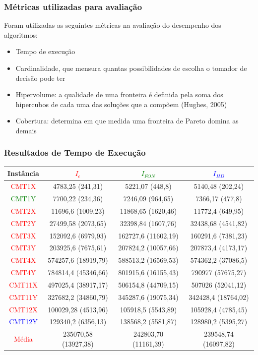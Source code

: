 \documentclass{beamer}
\begin{document}
\begin{frame}
  \frametitle{Métricas utilizadas para avaliação}
    Foram utilizadas as seguintes métricas na avaliação do desempenho dos algoritmos:
    \begin{itemize}
    \item Tempo de execução
    \item Cardinalidade, que mensura quantas possibilidades de escolha o tomador de decisão pode ter
    \item Hipervolume: a qualidade de uma fronteira é definida pela soma dos hipercubos de cada uma das soluções que a compõem (Hughes, 2005)
    \item Cobertura: determina em que medida uma fronteira de Pareto domina as demais
    \end{itemize}
  
\end{frame}

\begin{frame}
  \frametitle{Resultados de Tempo de Execução}
    \footnotesize{
    \begin{tabular}{c|ccc}
\hline
Instância & \textcolor{red}{$I_{\epsilon}$}             & \textcolor{green}{$I_{FON}$}             & \textcolor{blue}{ $I_{HD}$}      \\
\hline
\textcolor{red}{CMT1X}     & 4783,25 (241,31)    & 5221,07 (448,8)     & 5140,48 (202,24)    \\
\textcolor{green}{CMT1Y}     & 7700,22 (234,36)    & 7246,09 (964,65)    & 7366,17 (477,8)     \\
\textcolor{red}{CMT2X}     & 11696,6 (1009,23)   & 11868,65 (1620,46)  & 11772,4 (649,95)    \\
\textcolor{red}{CMT2Y}     & 27499,58 (2073,65)  & 32398,84 (1607,76)  & 32438,68 (4541,82)  \\
\textcolor{red}{CMT3X}     & 152092,6 (6979,93)  & 162727,6 (11602,19) & 160291,6 (7381,23)  \\
\textcolor{red}{CMT3Y}     & 203925,6 (7675,61)  & 207824,2 (10057,66) & 207873,4 (4173,17)  \\
\textcolor{red}{CMT4X}     & 574257,6 (18919,79) & 588513,2 (16569,53) & 574362,2 (37086,5)  \\
\textcolor{red}{CMT4Y}     & 784814,4 (45346,66) & 801915,6 (16155,43) & 790977 (57675,27)   \\	
\textcolor{red}{CMT11X}    & 497025,4 (38917,17) & 506154,8 (44709,15) & 507026 (52041,12)   \\
\textcolor{red}{CMT11Y}    & 327682,2 (34860,79) & 345287,6 (19075,34) & 342428,4 (18764,02) \\
\textcolor{red}{CMT12X}    & 100029,28 (4513,96) & 105918,5 (5543,89)  & 105928,4 (4785,45)  \\
\textcolor{blue}{CMT12Y}    & 129340,2 (6356,13)  & 138568,2 (5581,87)  & 128980,2 (5395,27)   \\
\hline
\textcolor{red}{Média}& 235070,58 (13927,38)& 242803,70 (11161,39)& 239548,74 (16097,82)\\
\hline
\end{tabular}
  }
\end{frame}
\end{document}
